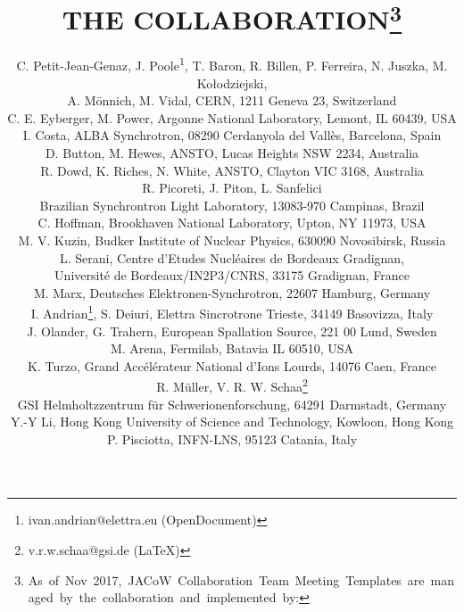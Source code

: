 \documentclass[a4paper,
				]{jacow}
\begin{document}
	\title{THE  COLLABORATION\thanks{\mbox{As of Nov 2017, JACoW Collaboration Team Meeting Templates are managed by the collaboration and implemented by:}}}

	\author{C. Petit-Jean-Genaz, J. Poole\textsuperscript{1}, T. Baron, R. Billen, 
			P. Ferreira, N. Juszka, M. Kołodziejski,\\
			A. Mönnich, M. Vidal, CERN, 1211 Geneva 23, Switzerland \\
		C. E. Eyberger, M. Power, Argonne National Laboratory, Lemont, IL 60439, USA \\
		I. Costa, ALBA Synchrotron, 08290 Cerdanyola del Vallès, Barcelona, Spain \\
		D. Button, M. Hewes, ANSTO, Lucas Heights NSW 2234, Australia \\
		R. Dowd, K. Riches, N. White, ANSTO, Clayton VIC 3168, Australia \\
		R. Picoreti, J. Piton, L. Sanfelici\\
		 Brazilian Synchrontron Light Laboratory, 13083-970 Campinas, Brazil \\
		C. Hoffman, Brookhaven National Laboratory, Upton, NY 11973, USA \\
		M. V. Kuzin, Budker Institute of Nuclear Physics, 630090 Novosibirsk, Russia \\
		L. Serani, Centre d’Etudes Nucléaires de Bordeaux Gradignan, \\
		Université de Bordeaux/IN2P3/CNRS, 33175 Gradignan, France  \\
		M. Marx, Deutsches Elektronen-Synchrotron, 22607 Hamburg, Germany \\
		I. Andrian\thanks{ivan.andrian@elettra.eu (OpenDocument)}, 
				  S. Deiuri, Elettra Sincrotrone Trieste, 34149 Basovizza, Italy \\
		J. Olander, G. Trahern, European Spallation Source, 221 00 Lund, Sweden \\
		M. Arena, Fermilab, Batavia IL 60510, USA \\
		K. Turzo, Grand Accélérateur National d'Ions Lourds, 14076 Caen, France \\
		R. Müller, V. R. W. Schaa\thanks{v.r.w.schaa@gsi.de (\LaTeX)} \\
		GSI Helmholtzzentrum für Schwerionenforschung, 64291 Darmstadt, Germany \\
		Y.-Y Li, Hong Kong University of Science and Technology, Kowloon, Hong Kong \\
		P. Pisciotta, INFN-LNS, 95123 Catania, Italy \\
}
\end{document}
